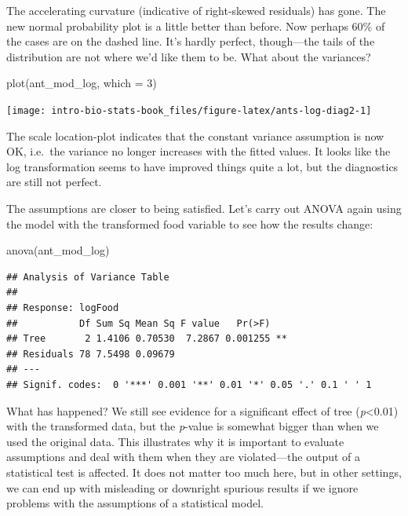 \documentclass[
]{book}
\newenvironment{Shaded}{\begin{snugshade}}{\end{snugshade}}
\newcommand{\AttributeTok}[1]{\textcolor[rgb]{0.77,0.63,0.00}{#1}}
\newcommand{\DecValTok}[1]{\textcolor[rgb]{0.00,0.00,0.81}{#1}}
\newcommand{\FunctionTok}[1]{\textcolor[rgb]{0.00,0.00,0.00}{#1}}
\newcommand{\NormalTok}[1]{#1}
\begin{document}
The accelerating curvature (indicative of right-skewed residuals) has gone. The new normal probability plot is a little better than before. Now perhaps 60\% of the cases are on the dashed line. It's hardly perfect, though---the tails of the distribution are not where we'd like them to be. What about the variances?

\begin{Shaded}
\begin{Highlighting}[]
\FunctionTok{plot}\NormalTok{(ant\_mod\_log, }\AttributeTok{which =} \DecValTok{3}\NormalTok{)}
\end{Highlighting}
\end{Shaded}

\begin{center}\texttt{[image: intro-bio-stats-book\_files/figure-latex/ants-log-diag2-1]} \end{center}

The scale location-plot indicates that the constant variance assumption is now OK, i.e.~the variance no longer increases with the fitted values. It looks like the log transformation seems to have improved things quite a lot, but the diagnostics are still not perfect.

The assumptions are closer to being satisfied. Let's carry out ANOVA again using the model with the transformed food variable to see how the results change:

\begin{Shaded}
\begin{Highlighting}[]
\FunctionTok{anova}\NormalTok{(ant\_mod\_log)}
\end{Highlighting}
\end{Shaded}

\begin{verbatim}
## Analysis of Variance Table
## 
## Response: logFood
##           Df Sum Sq Mean Sq F value   Pr(>F)   
## Tree       2 1.4106 0.70530  7.2867 0.001255 **
## Residuals 78 7.5498 0.09679                    
## ---
## Signif. codes:  0 '***' 0.001 '**' 0.01 '*' 0.05 '.' 0.1 ' ' 1
\end{verbatim}

What has happened? We still see evidence for a significant effect of tree (\emph{p}\textless0.01) with the transformed data, but the \emph{p}-value is somewhat bigger than when we used the original data. This illustrates why it is important to evaluate assumptions and deal with them when they are violated---the output of a statistical test is affected. It does not matter too much here, but in other settings, we can end up with misleading or downright spurious results if we ignore problems with the assumptions of a statistical model.
\end{document}
